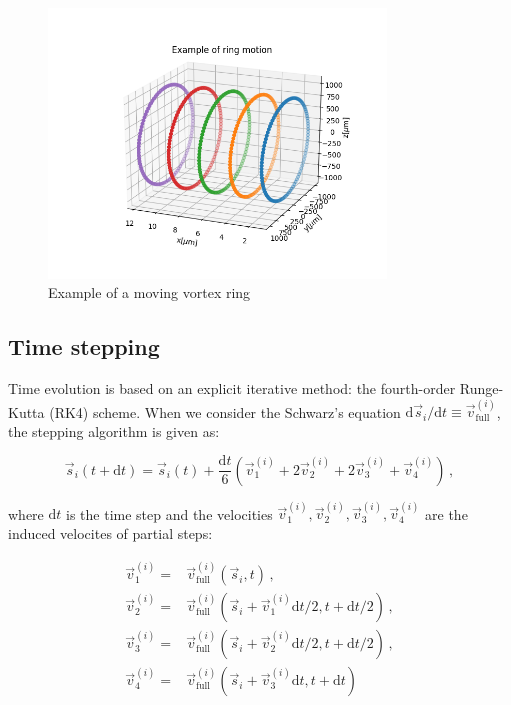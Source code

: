 \begin{figure}[h]
	\centering
	\includegraphics[width=0.8\textwidth]{graphics/simul/time-example}
	\caption{Example of a moving vortex ring}
	\label{motion}
\end{figure}

\subsection*{Time stepping}

Time evolution is based on an explicit iterative method: the fourth-order Runge-Kutta (RK4) scheme. When we consider the Schwarz's equation $\text{d}\vec{s}_i / \text{d}t \equiv \vec{v}_{\text{full}}^{(i)}$, the stepping algorithm is given as:

\begin{equation}
\vec{s}_{i}(t+\text{d}t) =
\vec{s}_{i}(t) +
\frac{\text{d}t}{6} (\vec{v}_1^{(i)} + 2\vec{v}_2^{(i)} + 2\vec{v}_3^{(i)} + \vec{v}_4^{(i)})\,,
\end{equation}

where $\text{d}t$ is the time step and the velocities $\vec{v}_1^{(i)}, \vec{v}_2^{(i)}, \vec{v}_3^{(i)}, \vec{v}_4^{(i)}$ are the induced velocites of partial steps:

\begin{align}
\vec{v}_1^{(i)} =& \vec{v}_{\text{full}}^{(i)}
(\vec{s}_i, t)\,,
\\
\vec{v}_2^{(i)} =& \vec{v}_{\text{full}}^{(i)}
(\vec{s}_i + \vec{v}_1^{(i)} \text{d}t / 2, t + \text{d}t / 2)\,,
\\
\vec{v}_3^{(i)} =& \vec{v}_{\text{full}}^{(i)}
(\vec{s}_i + \vec{v}_2^{(i)} \text{d}t / 2, t + \text{d}t / 2)\,,
\\
\vec{v}_4^{(i)} =& \vec{v}_{\text{full}}^{(i)}
(\vec{s}_i + \vec{v}_3^{(i)} \text{d}t, t + \text{d}t)
\end{align}

